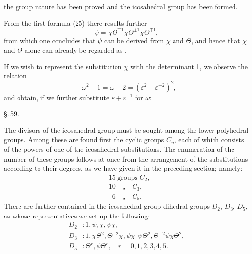the group nature has been proved and the icosahedral group has been formed.

From the first formula (25) there results further
\[
\psi = \chi\Theta^{\mp1}\chi\Theta^{\pm1}\chi\Theta^{\mp1},
\]
from which one concludes that $\psi$ can be derived from $\chi$ and $\Theta$, and hence that $\chi$ and $\Theta$ alone can already be regarded as .

If we wish to represent the substitution $\chi$ with the determinant 1, we observe the relation
\[
-\omega^2-1 = \omega-2 = (\varepsilon^2-\varepsilon^{-2})^2,
\]
and obtain, if we further substitute $\varepsilon+\varepsilon^{-1}$ for $\omega$:

\S.\,59.


The divisors of the icosahedral group must be sought among the lower polyhedral groups. Among these are found first the cyclic groups $C_n$, each of which consists of the powers of one of the icosahedral substitutions. The enumeration of the number of these groups follows at once from the arrangement of the substitutions according to their degrees, as we have given it in the preceding section; namely:
\[
\begin{aligned}
&15 \text{ groups } C_2, \\
&10 \quad \text{„} \quad C_3, \\
&\phantom{0}6 \quad \text{„} \quad C_5.
\end{aligned}
\]
There are further contained in the icosahedral group dihedral groups $D_2$, $D_3$, $D_5$, as whose representatives we set up the following:
\[
\begin{aligned}
D_2 &: 1, \psi, \chi, \psi\chi, \\
D_3 &: 1, \chi\Theta^2, \Theta^{-2}\chi, \psi\chi, \psi\Theta^2, \Theta^{-2}\psi\chi\Theta^2, \\
D_5 &: \Theta^r, \psi\Theta^r, \quad r=0,1,2,3,4,5.
\end{aligned}
\]
